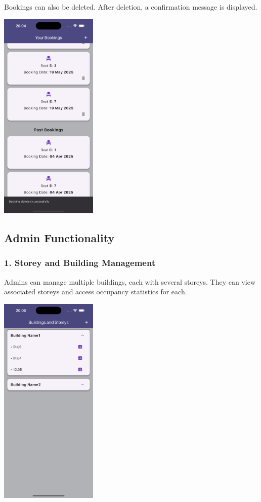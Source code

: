 \documentclass[12pt,a4paper]{report} %
\begin{document}
Bookings can also be deleted. After deletion, a confirmation message is displayed.

\begin{center}
\includegraphics[width=0.35\textwidth]{images/Simulator Screenshot - iPhone 16 Pro Max - 2025-05-19 at 20.04.30.png}
\end{center}

\subsection{Admin Functionality}

\subsubsection*{1. Storey and Building Management}

Admins can manage multiple buildings, each with several storeys. They can view associated storeys and access occupancy statistics for each.

\begin{center}
\includegraphics[width=0.35\textwidth]{images/Simulator Screenshot - iPhone 16 Pro Max - 2025-05-19 at 20.06.31.png}
\end{center}
\end{document}

